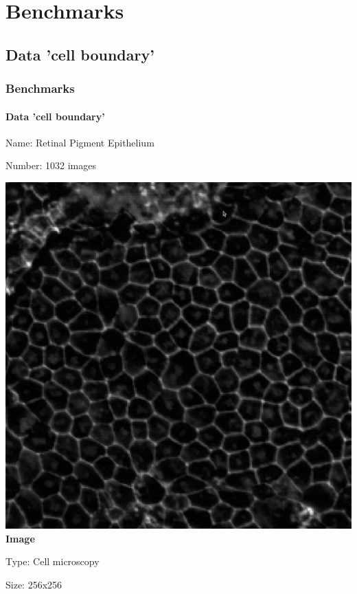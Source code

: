\def\sectiontitle{Benchmarks}

\section{\sectiontitle}

\def\slidetitle{Data 'cell boundary'}

\subsection{\slidetitle}
\begin{frame}
  \frametitle{\sectiontitle}
  \framesubtitle{\slidetitle}

  \begin{minipage}[h!]{0.40\textwidth}
    Name: Retinal Pigment Epithelium

    Number: 1032 images

    \centering
    \includegraphics[scale=0.12]{./img/3_benchmark/image.png}
    \textbf{Image}
  \end{minipage}\hfill
  \begin{minipage}[h!]{0.40\textwidth}
    Type: Cell microscopy

    Size: 256x256


\end{minipage}
\end{frame}
